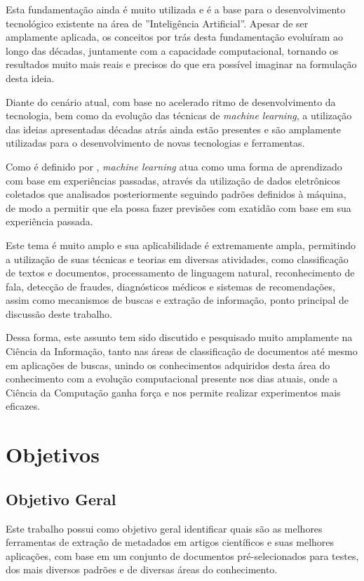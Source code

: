 Esta fundamentação ainda é muito utilizada e é a base para o desenvolvimento tecnológico existente na área de ''Inteligência Artificial''. Apesar de ser amplamente aplicada, os conceitos por trás desta fundamentação evoluíram ao longo das décadas, juntamente com a capacidade computacional, tornando os resultados muito mais reais e precisos do que era possível imaginar na formulação desta ideia.

Diante do cenário atual, com base no acelerado ritmo de desenvolvimento da tecnologia, bem como da evolução das técnicas de \textit{machine learning}, a utilização das ideias apresentadas décadas atrás ainda estão presentes e são amplamente utilizadas para o desenvolvimento de novas tecnologias e ferramentas.

Como é definido por \cite{foundations-machine-learning}, \textit{machine learning} atua como uma forma de aprendizado com base em experiências passadas, através da utilização de dados eletrônicos coletados que analisados posteriormente seguindo padrões definidos à máquina, de modo a permitir que ela possa fazer previsões com exatidão com base em sua experiência passada.

Este tema é muito amplo e sua aplicabilidade é extremamente ampla, permitindo a utilização de suas técnicas e teorias em diversas atividades, como classificação de textos e documentos, processamento de linguagem natural, reconhecimento de fala, detecção de fraudes, diagnósticos médicos e sistemas de recomendações, assim como mecanismos de buscas e extração de informação, ponto principal de discussão deste trabalho.

Dessa forma, este assunto tem sido discutido e pesquisado muito amplamente na Ciência da Informação, tanto nas áreas de classificação de documentos até mesmo em aplicações de buscas, unindo os conhecimentos adquiridos desta área do conhecimento com a evolução computacional presente nos dias atuais, onde a Ciência da Computação ganha força e nos permite realizar experimentos mais eficazes.

\section{Objetivos}
\label{sec:goals}

\subsection{Objetivo Geral}
\label{ssec:main-goal}

Este trabalho possui como objetivo geral identificar quais são as melhores ferramentas de extração de metadados em artigos científicos e suas melhores aplicações, com base em um conjunto de documentos pré-selecionados para testes, dos mais diversos padrões e de diversas áreas do conhecimento.

